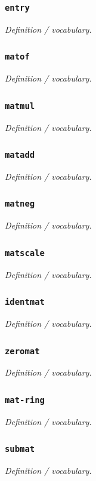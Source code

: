 \documentclass[11pt]{article}
\begin{document}
\subsubsection*{\texttt{entry}}
\emph{Definition / vocabulary.}

\subsubsection*{\texttt{matof}}
\emph{Definition / vocabulary.}

\subsubsection*{\texttt{matmul}}
\emph{Definition / vocabulary.}

\subsubsection*{\texttt{matadd}}
\emph{Definition / vocabulary.}

\subsubsection*{\texttt{matneg}}
\emph{Definition / vocabulary.}

\subsubsection*{\texttt{matscale}}
\emph{Definition / vocabulary.}

\subsubsection*{\texttt{identmat}}
\emph{Definition / vocabulary.}

\subsubsection*{\texttt{zeromat}}
\emph{Definition / vocabulary.}

\subsubsection*{\texttt{mat-ring}}
\emph{Definition / vocabulary.}

\subsubsection*{\texttt{submat}}
\emph{Definition / vocabulary.}
\end{document}
